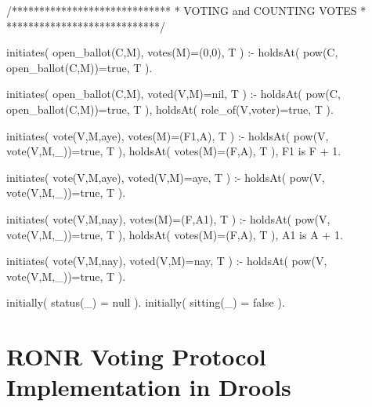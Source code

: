 \begin{prologinline}
/*****************************
 * VOTING and COUNTING VOTES *
 ****************************/


initiates( open_ballot(C,M), votes(M)=(0,0), T ) :-
	holdsAt( pow(C, open_ballot(C,M))=true, T ).

initiates( open_ballot(C,M), voted(V,M)=nil, T ) :-
    holdsAt( pow(C, open_ballot(C,M))=true, T ),
	holdsAt( role_of(V,voter)=true, T ).

initiates( vote(V,M,aye), votes(M)=(F1,A), T ) :-
	holdsAt( pow(V, vote(V,M,_))=true, T ),
	holdsAt( votes(M)=(F,A), T ),
	F1 is F + 1.

initiates( vote(V,M,aye), voted(V,M)=aye, T ) :-
	holdsAt( pow(V, vote(V,M,_))=true, T ).

initiates( vote(V,M,nay), votes(M)=(F,A1), T ) :-
	holdsAt( pow(V, vote(V,M,_))=true, T ),
	holdsAt( votes(M)=(F,A), T ),
	A1 is A + 1.

initiates( vote(V,M,nay), voted(V,M)=nay, T ) :-
	holdsAt( pow(V, vote(V,M,_))=true, T ).

initially( status(_) = null ).
initially( sitting(_) = false ).
\end{prologinline}

\section{RONR Voting Protocol Implementation in Drools}\label{sec:ronrdrools}

